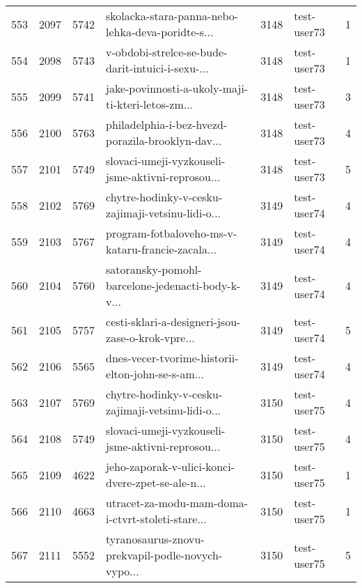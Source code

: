 \begin{tabular}{lrrlrlr}
553  &       2097 &     5742 &  skolacka-stara-panna-nebo-lehka-deva-poridte-s... &     3148 &                  test-user73 &               1 \\
554  &       2098 &     5743 &  v-obdobi-strelce-se-bude-darit-intuici-i-sexu-... &     3148 &                  test-user73 &               1 \\
555  &       2099 &     5741 &  jake-povinnosti-a-ukoly-maji-ti-kteri-letos-zm... &     3148 &                  test-user73 &               3 \\
556  &       2100 &     5763 &  philadelphia-i-bez-hvezd-porazila-brooklyn-dav... &     3148 &                  test-user73 &               4 \\
557  &       2101 &     5749 &  slovaci-umeji-vyzkouseli-jsme-aktivni-reprosou... &     3148 &                  test-user73 &               5 \\
558  &       2102 &     5769 &  chytre-hodinky-v-cesku-zajimaji-vetsinu-lidi-o... &     3149 &                  test-user74 &               4 \\
559  &       2103 &     5767 &  program-fotbaloveho-ms-v-kataru-francie-zacala... &     3149 &                  test-user74 &               4 \\
560  &       2104 &     5760 &  satoransky-pomohl-barcelone-jedenacti-body-k-v... &     3149 &                  test-user74 &               4 \\
561  &       2105 &     5757 &  cesti-sklari-a-designeri-jsou-zase-o-krok-vpre... &     3149 &                  test-user74 &               5 \\
562  &       2106 &     5565 &  dnes-vecer-tvorime-historii-elton-john-se-s-am... &     3149 &                  test-user74 &               4 \\
563  &       2107 &     5769 &  chytre-hodinky-v-cesku-zajimaji-vetsinu-lidi-o... &     3150 &                  test-user75 &               4 \\
564  &       2108 &     5749 &  slovaci-umeji-vyzkouseli-jsme-aktivni-reprosou... &     3150 &                  test-user75 &               4 \\
565  &       2109 &     4622 &  jeho-zaporak-v-ulici-konci-dvere-zpet-se-ale-n... &     3150 &                  test-user75 &               1 \\
566  &       2110 &     4663 &  utracet-za-modu-mam-doma-i-ctvrt-stoleti-stare... &     3150 &                  test-user75 &               1 \\
567  &       2111 &     5552 &  tyranosaurus-znovu-prekvapil-podle-novych-vypo... &     3150 &                  test-user75 &               5 \\

\end{tabular}
